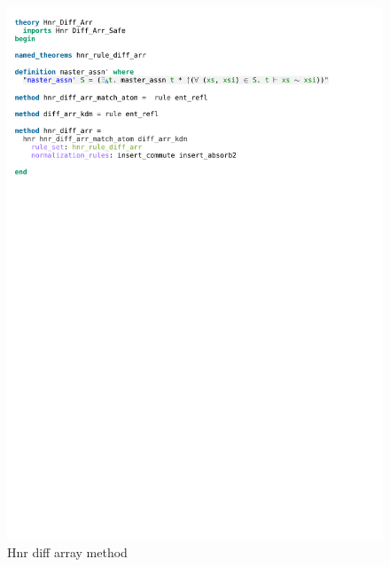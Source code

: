 \begin{figure}[!htbp]
    \includegraphics[trim={0 21,2cm 0 6,6cm}, clip, width=1.00\textwidth]{figures/Theory_Hnr_Diff_Arr_Method.pdf}
    \caption[Hnr diff array method]{Hnr diff array method}
    \label{fig:hnr_diff_arr_method}
    \vspace*{19cm}
\end{figure}
